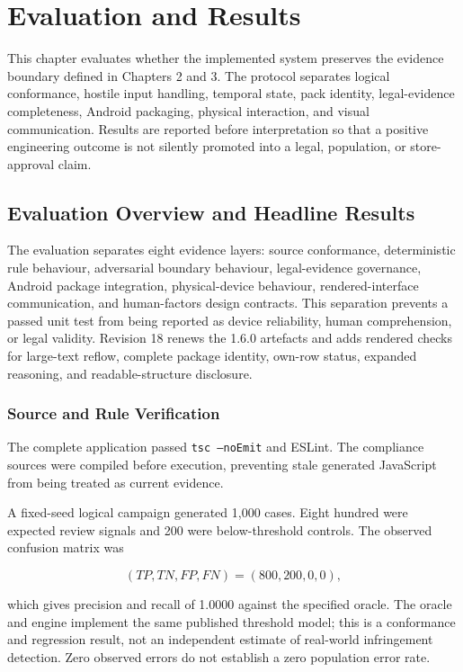 \section{Evaluation and Results}

This chapter evaluates whether the implemented system preserves the evidence boundary defined in Chapters 2 and 3. The protocol separates logical conformance, hostile input handling, temporal state, pack identity, legal-evidence completeness, Android packaging, physical interaction, and visual communication. Results are reported before interpretation so that a positive engineering outcome is not silently promoted into a legal, population, or store-approval claim.

\subsection{Evaluation Overview and Headline Results}

The evaluation separates eight evidence layers: source conformance, deterministic rule behaviour, adversarial boundary behaviour, legal-evidence governance, Android package integration, physical-device behaviour, rendered-interface communication, and human-factors design contracts. This separation prevents a passed unit test from being reported as device reliability, human comprehension, or legal validity. Revision 18 renews the 1.6.0 artefacts and adds rendered checks for large-text reflow, complete package identity, own-row status, expanded reasoning, and readable-structure disclosure.

\subsubsection{Source and Rule Verification}

The complete application passed \texttt{tsc --noEmit} and ESLint. The compliance sources were compiled before execution, preventing stale generated JavaScript from being treated as current evidence.

A fixed-seed logical campaign generated 1,000 cases. Eight hundred were expected review signals and 200 were below-threshold controls. The observed confusion matrix was

\begin{equation}
(TP,TN,FP,FN)=(800,200,0,0),
\end{equation}

which gives precision and recall of 1.0000 against the specified oracle. The oracle and engine implement the same published threshold model; this is a conformance and regression result, not an independent estimate of real-world infringement detection. Zero observed errors do not establish a zero population error rate.


